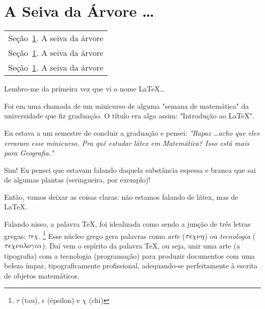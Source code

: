 \section{A Seiva da Árvore \ldots}\label{sec:seiva} %

\begin{margintable}\vspace{.8in}\footnotesize
  \begin{tabularx}{\marginparwidth}{|X}
    Seção~\ref{sec:seiva}. A seiva da árvore\\
    Seção~\ref{sec:seiva}. A seiva da árvore\\
    Seção~\ref{sec:seiva}. A seiva da árvore\\
  \end{tabularx}
\end{margintable}

Lembro-me da primeira vez que vi o nome \LaTeX \ldots

Foi em uma chamada de um minicurso de alguma "semana de matemática" da 
universidade que fiz graduação.
O título era algo assim: "Introdução ao \LaTeX".

Eu estava a um semestre de concluir a graduação e pensei: 
\textit{
  "Rapaz \ldots acho que eles erraram esse minicurso. 
  Pra quê estudar látex em Matemática? 
  Isso está mais para Geografia."
}

Sim! 
Eu pensei que estavam falando daquela substância espessa e branca que sai de 
algumas plantas (seringueira, por exemplo)!

Então, vamos deixar as coisas claras: não estamos falando de látex, mas de \LaTeX.

Falando nisso, a palavra \TeX, foi idealizada como sendo a junção de três letras
gregas: $\tau\epsilon\chi$. \footnote{$\tau$ (tau), $\epsilon$ (épsilon) e $\chi$ (chi)}
Esse núcleo grego gera palavras como \textit{arte} ($\small \tau\epsilon\chi\nu\eta$) ou 
\textit{tecnologia} ($\small \tau\epsilon\chi\nu o \lambda o \gamma\iota\alpha$).
Daí vem o espírito da palavra \TeX, ou seja, unir uma arte (a tipografia) com 
a tecnologia (programação) para produzir documentos com uma beleza ímpar, 
tipograficamente profissional, adequando-se perfeitamente à escrita de objetos
matemáticos.







